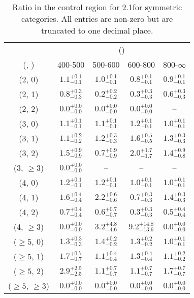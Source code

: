 \begin{table}[h!]
\tiny
\centering
\caption{Ratio in the \gj control region for 2.1\ifb for symmetric categories. All entries are non-zero but are truncated to one decimal place.\label{tab:ratiosepnaive_gj_ewk_sym}}
\begin{tabular}
{ccccc}
	\hline\hline
	& \multicolumn{4}{c}{\scalht (\gev)} \\ 
	 (\njet,  \nb) & 400-500 & 500-600 & 600-800 & 800-$\infty$ \\ [0.8ex] 
\hline
	(2, 0) & $1.1^{+ 0.1 }_{- 0.1 }$ & $1.0^{+ 0.1 }_{- 0.1 }$ & $0.8^{+ 0.1 }_{- 0.1 }$ & $0.9^{+ 0.1 }_{- 0.1 }$ \\[0.5ex] 
	(2, 1) & $0.8^{+ 0.3 }_{- 0.3 }$ & $0.2^{+ 0.2 }_{- 0.2 }$ & $0.3^{+ 0.3 }_{- 0.3 }$ & $0.6^{+ 0.3 }_{- 0.3 }$ \\[0.5ex] 
	(2, 2) & $0.0^{+ 0.0 }_{- 0.0 }$ & $0.0^{+ 0.0 }_{- 0.0 }$ & $0.0^{+ 0.0 }_{- 0.0 }$ & -- \\[0.5ex] 
	(3, 0) & $1.1^{+ 0.1 }_{- 0.1 }$ & $1.1^{+ 0.1 }_{- 0.1 }$ & $1.2^{+ 0.1 }_{- 0.1 }$ & $1.0^{+ 0.1 }_{- 0.1 }$ \\[0.5ex] 
	(3, 1) & $1.1^{+ 0.2 }_{- 0.2 }$ & $1.2^{+ 0.3 }_{- 0.3 }$ & $1.6^{+ 0.5 }_{- 0.5 }$ & $1.3^{+ 0.3 }_{- 0.3 }$ \\[0.5ex] 
	(3, 2) & $1.5^{+ 0.9 }_{- 0.9 }$ & $0.7^{+ 0.9 }_{- 0.9 }$ & $2.0^{+ 1.7 }_{- 1.7 }$ & $1.4^{+ 0.9 }_{- 0.8 }$ \\[0.5ex] 
	(3, $\ge3$) & $0.0^{+ 0.0 }_{- 0.0 }$ & -- & -- & -- \\[0.5ex] 
	(4, 0) & $1.2^{+ 0.1 }_{- 0.1 }$ & $1.2^{+ 0.1 }_{- 0.1 }$ & $1.0^{+ 0.1 }_{- 0.1 }$ & $1.0^{+ 0.1 }_{- 0.1 }$ \\[0.5ex] 
	(4, 1) & $1.6^{+ 0.4 }_{- 0.4 }$ & $2.2^{+ 0.6 }_{- 0.6 }$ & $0.7^{+ 0.3 }_{- 0.3 }$ & $1.4^{+ 0.3 }_{- 0.3 }$ \\[0.5ex] 
	(4, 2) & $0.7^{+ 0.4 }_{- 0.4 }$ & $0.6^{+ 0.7 }_{- 0.7 }$ & $0.3^{+ 0.3 }_{- 0.3 }$ & $0.5^{+ 0.4 }_{- 0.4 }$ \\[0.5ex] 
	(4, $\ge3$) & $0.0^{+ 0.0 }_{- 0.0 }$ & $3.2^{+ 4.8 }_{- 4.6 }$ & $9.2^{+ 14.8 }_{- 13.6 }$ & $0.0^{+ 0.0 }_{- 0.0 }$ \\[0.5ex] 
	($\ge5$, 0) & $1.3^{+ 0.3 }_{- 0.3 }$ & $1.4^{+ 0.2 }_{- 0.2 }$ & $1.3^{+ 0.2 }_{- 0.2 }$ & $1.0^{+ 0.1 }_{- 0.1 }$ \\[0.5ex] 
	($\ge5$, 1) & $1.7^{+ 0.7 }_{- 0.7 }$ & $1.1^{+ 0.4 }_{- 0.4 }$ & $1.3^{+ 0.4 }_{- 0.4 }$ & $1.1^{+ 0.2 }_{- 0.2 }$ \\[0.5ex] 
	($\ge5$, 2) & $2.9^{+ 2.5 }_{- 2.5 }$ & $1.1^{+ 0.7 }_{- 0.7 }$ & $1.1^{+ 0.7 }_{- 0.7 }$ & $1.7^{+ 0.7 }_{- 0.7 }$ \\[0.5ex] 
	($\ge5$, $\ge3$) & $0.0^{+ 0.0 }_{- 0.0 }$ & $0.0^{+ 0.0 }_{- 0.0 }$ & $0.0^{+ 0.0 }_{- 0.0 }$ & $0.0^{+ 0.0 }_{- 0.0 }$ \\[0.5ex] 
	\hline
	\hline
\end{tabular}
\end{table}
